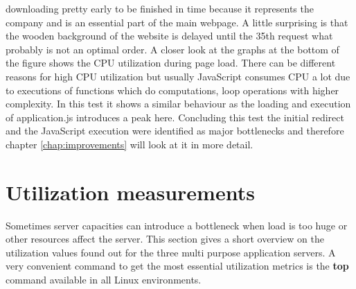 downloading pretty early to be finished in time because it represents the company and is an essential part of the main webpage. A little surprising is that the wooden background of the website is delayed until the 35th request what probably is not an optimal order. A closer look at the graphs at the bottom of the figure shows the CPU utilization during page load. There can be different reasons for high CPU utilization but usually JavaScript consumes CPU a lot due to executions of functions which do computations, loop operations with higher complexity. In this test it shows a similar behaviour as the loading and execution of application.js introduces a peak here. Concluding this test the initial redirect and the JavaScript execution were identified as major bottlenecks and therefore chapter \ref{chap:improvements} will look at it in more detail. 

\section{Utilization measurements}
Sometimes server capacities can introduce a bottleneck when load is too huge or other resources affect the server. This section gives a short overview on the utilization values found out for the three multi purpose application servers.  A very convenient command to get the most essential utilization metrics is the \textbf{top} command available in all Linux environments.

